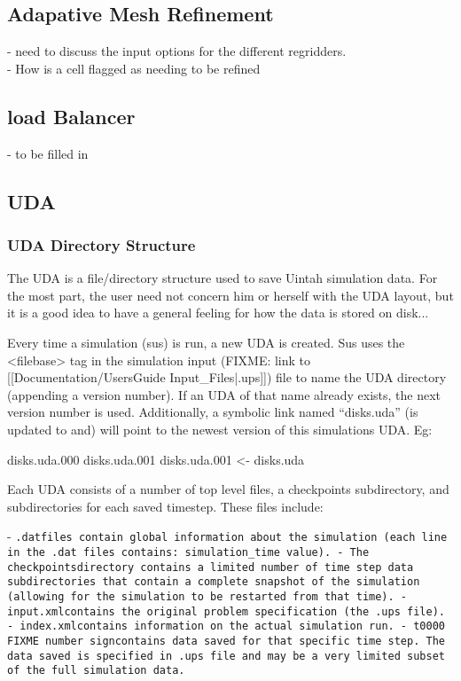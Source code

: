 %
\subsection{Adapative Mesh Refinement}
- need to discuss the input options for the different regridders.\\
- How is a cell flagged as needing to be refined
%
\subsection{load Balancer}
- to be filled in

\subsection{UDA}

\subsubsection{UDA Directory Structure}

The UDA is a file/directory structure used to save Uintah simulation
data.  For the most part, the user need not concern him or herself
with the UDA layout, but it is a good idea to have a general feeling
for how the data is stored on disk...


Every time a simulation (sus) is run, a new UDA is created.  Sus uses
the <filebase> tag in the simulation input
(FIXME: link to [[Documentation/UsersGuide Input\_Files|.ups]]) file to name the UDA
directory (appending a version number).  If an UDA of that name
already exists, the next version number is used.  Additionally, a
symbolic link named ``disks.uda'' (is updated to and) will point to
the newest version of this simulations UDA.  Eg:

disks.uda.000
disks.uda.001
disks.uda.001 <- disks.uda


Each UDA consists of a number of top level files, a checkpoints
subdirectory, and subdirectories for each saved timestep.  These files
include:

- \tt.dat\normalfont files contain global information about the simulation
(each line in the .dat files contains: simulation\_time value).
- The \tt checkpoints\normalfont directory contains a limited number of time
step data subdirectories that contain a complete snapshot of the
simulation (allowing for the simulation to be restarted from that
time).
- \tt input.xml\normalfont contains the original problem specification (the
.ups file).
- \tt index.xml\normalfont contains information on the actual simulation run.
- \tt t0000 FIXME number sign\normalfont contains data saved for that specific time step.  The
data saved is specified in .ups file and may be a very limited subset
of the full simulation data.

